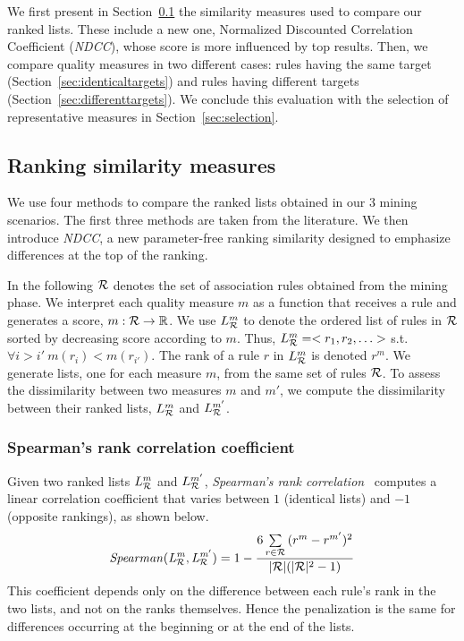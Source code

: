 We first present in Section~\ref{sec:correlations} the similarity measures used to compare our ranked lists.
These include a new one,
Normalized Discounted Correlation Coefficient ({\em NDCC}),
whose score is more influenced by top results.
Then, we compare quality measures in two different cases:
rules having the same target (Section~\ref{sec:identicaltargets}) and rules having different targets (Section~\ref{sec:differenttargets}).
We conclude this evaluation with the selection of representative measures in Section~\ref{sec:selection}.

\subsection{Ranking similarity measures}
\label{sec:correlations}

We use four methods to compare the ranked lists obtained in our 3 mining scenarios.
The first three methods are taken from the literature.
We then introduce {\em NDCC}, a new parameter-free ranking similarity designed to emphasize differences at the top of the ranking.

In the following $\mathcal{R}$ denotes the set of association rules obtained from the mining phase.
We interpret each quality measure $m$ as a function that receives a rule and generates a score,
$m:{\mathcal{R}}\rightarrow \mathbb{R}$.
We use $L_{\mathcal{R}}^m$ to denote the ordered list of rules in $\mathcal{R}$ sorted by decreasing score according to $m$.
Thus, $L_{\mathcal{R}}^m=<r_{1},r_{2},\ldots>$ s.t. $\forall i>i'\ m(r_{i})<m(r_{i'})$.
The rank of a rule $r$ in $L_{\mathcal{R}}^m$ is denoted $r^m$.
We generate \nbm lists, one for each measure $m$, from the same set of rules $\mathcal{R}$.
To assess the dissimilarity between two measures $m$ and $m'$,
we compute the dissimilarity between their ranked lists, $L_{\mathcal{R}}^m$ and $L_{\mathcal{R}}^{m'}$.



\subsubsection{Spearman's rank correlation coefficient}

Given two ranked lists $L_{\mathcal{R}}^m$ and $L_{\mathcal{R}}^{m'}$,
{\em Spearman's rank correlation}~\cite{Daniel1978}
computes a linear correlation coefficient that varies between $1$ (identical lists)
and $-1$ (opposite rankings), as shown below.
$$\mathit{Spearman(L_{\mathcal{R}}^m,L_{\mathcal{R}}^{m'})} = 1 - \frac{6\sum\limits_{r\in \mathcal{R}}{(r^m-r^{m'})^2}}{|\mathcal{R}|(|\mathcal{R}|^2-1)}$$
This coefficient depends only on the difference between each rule's rank in the two lists,
and not on the ranks themselves.
Hence the penalization is the same for differences occurring at the beginning or at the end of the lists.


